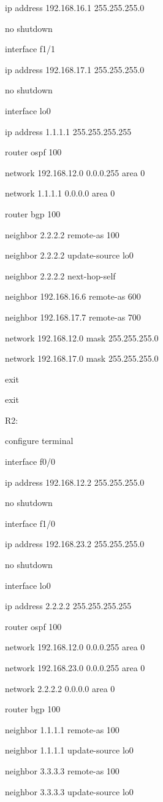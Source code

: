 \documentclass[12pt]{article}
\begin{document}
ip address 192.168.16.1 255.255.255.0

no shutdown

interface f1/1

ip address 192.168.17.1 255.255.255.0

no shutdown

interface lo0

ip address 1.1.1.1 255.255.255.255

router ospf 100

network 192.168.12.0 0.0.0.255 area 0

network 1.1.1.1 0.0.0.0 area 0

router bgp 100

neighbor 2.2.2.2 remote-as 100

neighbor 2.2.2.2 update-source lo0

neighbor 2.2.2.2 next-hop-self

neighbor 192.168.16.6 remote-as 600

neighbor 192.168.17.7 remote-as 700

network 192.168.12.0 mask 255.255.255.0

network 192.168.17.0 mask 255.255.255.0

exit

exit


\noindent R2:

configure terminal

interface f0/0

ip address 192.168.12.2 255.255.255.0

no shutdown

interface f1/0

ip address 192.168.23.2 255.255.255.0

no shutdown

interface lo0

ip address 2.2.2.2 255.255.255.255

router ospf 100

network 192.168.12.0 0.0.0.255 area 0

network 192.168.23.0 0.0.0.255 area 0

network 2.2.2.2 0.0.0.0 area 0

router bgp 100

neighbor 1.1.1.1 remote-as 100

neighbor 1.1.1.1 update-source lo0

neighbor 3.3.3.3 remote-as 100

neighbor 3.3.3.3 update-source lo0
\end{document}
